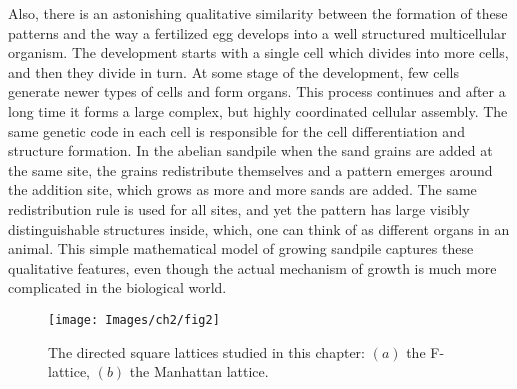 \documentclass[11pt,a4paper]{book}
\begin{document}
Also, there is an astonishing qualitative similarity between the formation of these
patterns and the way a fertilized egg develops into a well
structured multicellular organism. The development starts with a single cell which
divides into more cells, and then they divide in turn. At some stage
of the development, few cells generate newer types of cells and form
organs. This process continues and after a long time it forms a large
complex, but highly coordinated cellular assembly. The same genetic code in each cell is
responsible for the cell differentiation and structure formation. In
the abelian sandpile when the sand grains are added at the same
site, the grains redistribute themselves and a pattern emerges around
the addition site, which grows as more and more sands are added. The
same redistribution rule is used for all sites, and yet the pattern
has large visibly distinguishable structures inside, which, one can
think of as different organs in an animal.
This simple mathematical model of growing sandpile captures these
qualitative features, even though the actual mechanism of growth is
much more complicated in the biological world.
\begin{figure}
 \begin{center}
 \texttt{[image: Images/ch2/fig2]}
 \caption{The directed square lattices studied in this chapter: $(a)$ the  
 F-lattice, $(b)$ the Manhattan lattice.}
 \label{lattice}
 \end{center}
\end{figure}
\end{document}
